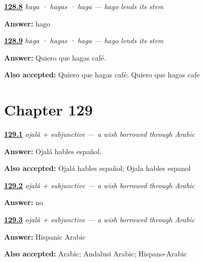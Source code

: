 \noindent\begin{minipage}[t]{\linewidth}
\raggedright
\hyperlink{review-ES-C18-hacer-subjuntivo-stem}{\textbf{128.8}} \emph{haga · hagas · haga — hago lends its stem}\par
\small \textbf{Answer:} hago\par
\end{minipage}\par\medskip

\noindent\begin{minipage}[t]{\linewidth}
\raggedright
\hyperlink{review-ES-C18-hacer-subjuntivo-wanted}{\textbf{128.9}} \emph{haga · hagas · haga — hago lends its stem}\par
\small \textbf{Answer:} Quiero que hagas café.\par
\footnotesize \textbf{Also accepted:} Quiero que hagas café; Quiero que hagas cafe
\end{minipage}\par\medskip

\section*{Chapter 129}

\noindent\begin{minipage}[t]{\linewidth}
\raggedright
\hyperlink{review-ES-C18-ojala-trigger}{\textbf{129.1}} \emph{ojalá + subjunctive — a wish borrowed through Arabic}\par
\small \textbf{Answer:} Ojalá hables español.\par
\footnotesize \textbf{Also accepted:} Ojalá hables español; Ojala hables espanol
\end{minipage}\par\medskip

\noindent\begin{minipage}[t]{\linewidth}
\raggedright
\hyperlink{review-ES-C18-ojala-no-que}{\textbf{129.2}} \emph{ojalá + subjunctive — a wish borrowed through Arabic}\par
\small \textbf{Answer:} no\par
\end{minipage}\par\medskip

\noindent\begin{minipage}[t]{\linewidth}
\raggedright
\hyperlink{review-ES-C18-ojala-source}{\textbf{129.3}} \emph{ojalá + subjunctive — a wish borrowed through Arabic}\par
\small \textbf{Answer:} Hispanic Arabic\par
\footnotesize \textbf{Also accepted:} Arabic; Andalusi Arabic; Hispano-Arabic
\end{minipage}\par\medskip

